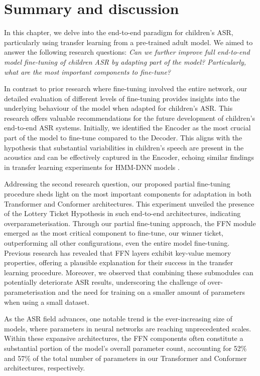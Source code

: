 \section{Summary and discussion}

In this chapter, we delve into the end-to-end paradigm for children's \ac{ASR}, particularly using transfer learning from a pre-trained adult model. We aimed to answer the following research questions: \textit{Can we further improve full end-to-end model fine-tuning of children \ac{ASR} by adapting part of the model? Particularly, what are the most important components to fine-tune?}

In contrast to prior research where fine-tuning involved the entire network, our detailed evaluation of different levels of fine-tuning provides insights into the underlying behaviour of the model when adapted for children's \ac{ASR}. This research offers valuable recommendations for the future development of children's end-to-end \ac{ASR} systems. Initially, we identified the Encoder as the most crucial part of the model to fine-tune compared to the Decoder. This aligns with the hypothesis that substantial variabilities in children's speech are present in the acoustics and can be effectively captured in the Encoder, echoing similar findings in transfer learning experiments for \ac{HMM-DNN} models \cite{TFchildren}.

Addressing the second research question, our proposed partial fine-tuning procedure sheds light on the most important components for adaptation in both Transformer and Conformer architectures. This experiment unveiled the presence of the Lottery Ticket Hypothesis in such end-to-end architectures, indicating overparameterisation. Through our partial fine-tuning approach, the \ac{FFN} module emerged as the most critical component to fine-tune, our winner ticket, outperforming all other configurations, even the entire model fine-tuning. Previous research \cite{geva2020transformer} has revealed that \ac{FFN} layers exhibit key-value memory properties, offering a plausible explanation for their success in the transfer learning procedure. Moreover, we observed that combining these submodules can potentially deteriorate \ac{ASR} results, underscoring the challenge of over-parameterisation and the need for training on a smaller amount of parameters when using a small dataset. 

As the \ac{ASR} field advances, one notable trend is the ever-increasing size of models, where parameters in neural networks are reaching unprecedented scales. 
Within these expansive architectures, the \ac{FFN} components often constitute a substantial portion of the model's overall parameter count, accounting for 52\% and 57\% of the total number of parameters in our Transformer and Conformer architectures, respectively.

